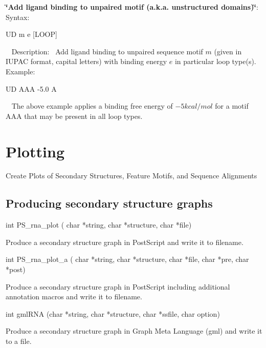 \begin{DoxyEnumerate}
\item {\bfseries \char`\"{}\+Add ligand binding to unpaired motif (a.\+k.\+a. unstructured domains)\char`\"{}}\+:~\newline
 Syntax\+:
\begin{DoxyCode}
UD m e [LOOP] 
\end{DoxyCode}
~\newline
 Description\+:~\newline
 Add ligand binding to unpaired sequence motif $ m $ (given in I\+U\+P\+AC format, capital letters) with binding energy $ e $ in particular loop type(s).~\newline
 Example\+: 
\begin{DoxyCode}
UD  AAA   -5.0    A
\end{DoxyCode}
~\newline
 The above example applies a binding free energy of $ -5 kcal/mol $ for a motif A\+AA that may be present in all loop types. 
\end{DoxyEnumerate}\hypertarget{plots}{}\section{Plotting}\label{plots}
Create Plots of Secondary Structures, Feature Motifs, and Sequence Alignments\hypertarget{plots_utils_ss}{}\subsection{Producing secondary structure graphs}\label{plots_utils_ss}
\begin{DoxyVerb}int PS_rna_plot ( char *string,
                  char *structure,
                  char *file)
\end{DoxyVerb}
 Produce a secondary structure graph in Post\+Script and write it to \textquotesingle{}filename\textquotesingle{}.

\begin{DoxyVerb}int PS_rna_plot_a (
            char *string,
            char *structure,
            char *file,
            char *pre,
            char *post)
\end{DoxyVerb}
 Produce a secondary structure graph in Post\+Script including additional annotation macros and write it to \textquotesingle{}filename\textquotesingle{}.

\begin{DoxyVerb}int gmlRNA (char *string,
            char *structure,
            char *ssfile,
            char option)
\end{DoxyVerb}
 Produce a secondary structure graph in Graph Meta Language (gml) and write it to a file.

